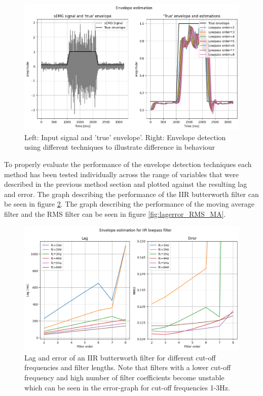 \begin{figure}[h!t]
	\begin{center}
		\includegraphics[width=1.0\columnwidth]{images/envelope_detection.png}
	\end{center}
	\caption{Left: Input signal and 'true' envelope'. Right: Envelope detection using different techniques to illustrate difference in behaviour}
	\label{fig:envelope_detection}
\end{figure}

To properly evaluate the performance of the envelope detection techniques each method has been tested individually across the range of variables that were described in the previous method section and plotted against the resulting lag and error. The graph describing the performance of the IIR butterworth filter can be seen in figure \ref{fig:lagerror_iir}. The graph describing the performance of the moving average filter and the RMS filter can be seen in figure \ref{fig:lagerror_RMS_MA}.

\begin{figure}[h!t]
	\begin{center}
		\includegraphics[width=1.0\columnwidth]{images/lagerror_iirfilter.png}
	\end{center}
	\caption{Lag and error of an IIR butterworth filter for different cut-off frequencies and filter lengths. Note that filters with a lower cut-off frequency and high number of filter coefficients become unstable which can be seen in the error-graph for cut-off frequencies 1-3Hz.}
	\label{fig:lagerror_iir}
\end{figure}

